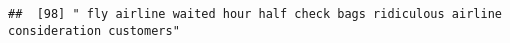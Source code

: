 \documentclass[
]{article}
\begin{document}
\begin{verbatim}
##  [98] " fly airline waited hour half check bags ridiculous airline consideration customers"                                                                                                                                                                                                                                                                                                                                                                                                                                                                                                                                                                                                                                                                                                                                                                                                                                                                                                                                                                                                                                                                                                                                                                                                                                                                                                                                                                                                                                                                                                                                                                                                                                                                                                           

\end{verbatim}
\end{document}
